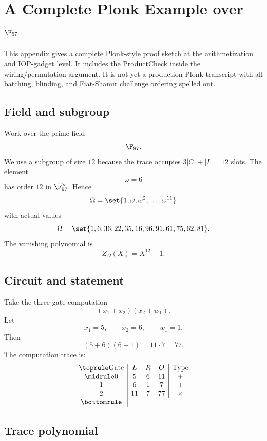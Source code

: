 ﻿\section{A Complete Plonk Example over \texorpdfstring{$\F_{97}$}{F97}}

This appendix gives a complete Plonk-style proof sketch at the arithmetization and IOP-gadget level. It includes the ProductCheck inside the wiring/permutation argument. It is not yet a production Plonk transcript with all batching, blinding, and Fiat-Shamir challenge ordering spelled out.

\subsection{Field and subgroup}

Work over the prime field
\[
    \F_{97}.
\]
We use a subgroup of size $12$ because the trace occupies $3|C|+|I|=12$ slots. The element
\[
    \omega=6
\]
has order $12$ in $\F_{97}^\times$. Hence
\[
    \Omega=\set{1,\omega,\omega^2,\ldots,\omega^{11}}
\]
with actual values
\[
    \Omega=\set{1,6,36,22,35,16,96,91,61,75,62,81}.
\]
The vanishing polynomial is
\[
    Z_\Omega(X)=X^{12}-1.
\]

\subsection{Circuit and statement}

Take the three-gate computation
\[
    (x_1+x_2)(x_2+w_1).
\]
Let
\[
    x_1=5,
    \qquad
    x_2=6,
    \qquad
    w_1=1.
\]
Then
\[
    (5+6)(6+1)=11\cdot7=77.
\]
The computation trace is:
\[
\begin{array}{c|ccc|c}
\toprule
\text{Gate} & L & R & O & \text{Type}\\
\midrule
0 & 5 & 6 & 11 & +\\
1 & 6 & 1 & 7 & +\\
2 & 11 & 7 & 77 & \times\\
\bottomrule
\end{array}
\]

\subsection{Trace polynomial}

